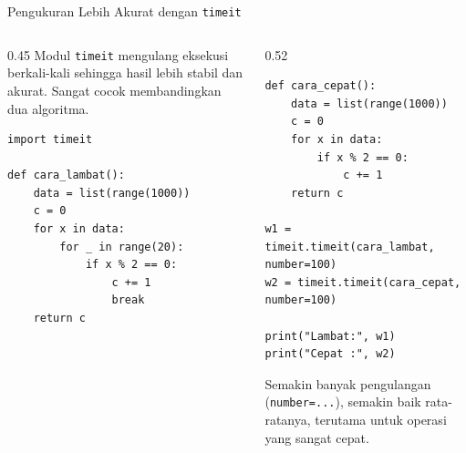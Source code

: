 \documentclass[aspectratio=169, table]{beamer}
\begin{document}
\begin{frame}[fragile]{Pengukuran Lebih Akurat dengan \texttt{timeit}}
\vspace{10pt}

\begin{columns}[T]

\begin{column}{0.45\linewidth}
\small
Modul \texttt{timeit} mengulang eksekusi berkali-kali sehingga hasil
lebih stabil dan akurat. Sangat cocok membandingkan dua algoritma.

\begin{lstlisting}[style=PythonStyle, basicstyle=\ttfamily\scriptsize]
import timeit

def cara_lambat():
    data = list(range(1000))
    c = 0
    for x in data:
        for _ in range(20):
            if x % 2 == 0:
                c += 1
                break
    return c
\end{lstlisting}
\end{column}

\begin{column}{0.52\linewidth}

\begin{lstlisting}[style=PythonStyle, basicstyle=\ttfamily\scriptsize, firstnumber=12]
def cara_cepat():
    data = list(range(1000))
    c = 0
    for x in data:
        if x % 2 == 0:
            c += 1
    return c

w1 = timeit.timeit(cara_lambat, number=100)
w2 = timeit.timeit(cara_cepat, number=100)

print("Lambat:", w1)
print("Cepat :", w2)
\end{lstlisting}
Semakin banyak pengulangan (\texttt{number=...}), semakin baik rata-ratanya,
terutama untuk operasi yang sangat cepat.

\end{column}
\end{columns}
\end{frame}
\end{document}
